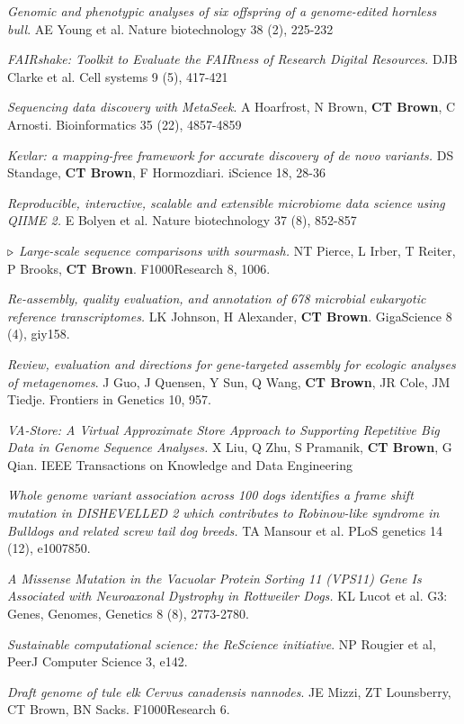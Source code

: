 \documentclass[margin,line]{resume}
\begin{document}
\begin{resume}
{\em Genomic and phenotypic analyses of six offspring of a genome-edited hornless bull}. AE Young et al. Nature biotechnology 38 (2), 225-232

{\em FAIRshake: Toolkit to Evaluate the FAIRness of Research Digital Resources}. DJB Clarke et al.
Cell systems 9 (5), 417-421

{\em Sequencing data discovery with MetaSeek}. A Hoarfrost, N Brown, {\bf CT Brown}, C Arnosti. Bioinformatics 35 (22), 4857-4859

{\em Kevlar: a mapping-free framework for accurate discovery of de novo variants.} DS Standage, {\bf CT Brown}, F Hormozdiari. iScience 18, 28-36

{\em Reproducible, interactive, scalable and extensible microbiome data science using QIIME 2.} E Bolyen et al.
Nature biotechnology 37 (8), 852-857

{\color{red} ${\bf \triangleright}$}
{\em Large-scale sequence comparisons with sourmash.} NT Pierce, L Irber, T Reiter, P Brooks, {\bf CT Brown}. F1000Research 8, 1006.

{\em Re-assembly, quality evaluation, and annotation of 678 microbial eukaryotic reference transcriptomes.} LK Johnson, H Alexander, {\bf CT Brown}. GigaScience 8 (4), giy158.

{\em Review, evaluation and directions for gene-targeted assembly for ecologic analyses of metagenomes}. J Guo, J Quensen, Y Sun, Q Wang, {\bf CT Brown}, JR Cole, JM Tiedje. Frontiers in Genetics 10, 957.

{\em VA-Store: A Virtual Approximate Store Approach to Supporting
  Repetitive Big Data in Genome Sequence Analyses.} X Liu, Q Zhu, S
Pramanik, {\bf CT Brown}, G Qian.  IEEE Transactions on Knowledge and Data
Engineering

{\em Whole genome variant association across 100 dogs identifies a frame shift mutation in DISHEVELLED 2 which contributes to Robinow-like syndrome in Bulldogs and related screw tail dog breeds.} TA Mansour et al.
PLoS genetics 14 (12), e1007850.

{\em A Missense Mutation in the Vacuolar Protein Sorting 11 (VPS11) Gene Is Associated with Neuroaxonal Dystrophy in Rottweiler Dogs.} KL Lucot et al.
G3: Genes, Genomes, Genetics 8 (8), 2773-2780.

{\em Sustainable computational science: the ReScience initiative}. NP Rougier et al, PeerJ Computer Science 3, e142.

{\em Draft genome of tule elk Cervus canadensis nannodes}. JE Mizzi, ZT Lounsberry, CT Brown, BN Sacks. F1000Research 6.


\end{resume}
\end{document}
